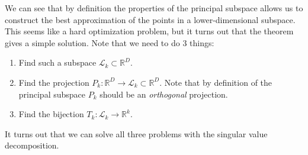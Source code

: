     We can see that by definition the properties of the principal subspace allows us to construct the best approximation of the points in a lower-dimensional subspace. This seems like a hard optimization problem, but it turns out that the theorem gives a simple solution. Note that we need to do 3 things: 
    \begin{enumerate}
      \item Find such a subspace $\mathcal{L}_k \subset \mathbb{R}^D$. 
      \item Find the projection $P_k: \mathbb{R}^D \rightarrow \mathcal{L}_k \subset \mathbb{R}^D$. Note that by definition of the principal subspace $P_k$ should be an \textit{orthogonal} projection. 
      \item Find the bijection $T_k: \mathcal{L}_k \rightarrow \mathbb{R}^k$. 
    \end{enumerate}
    It turns out that we can solve all three problems with the singular value decomposition. 

